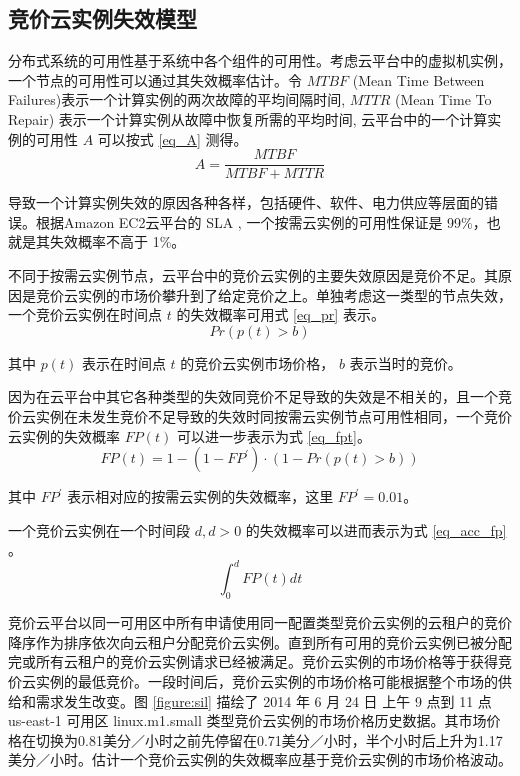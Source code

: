 \subsection{竞价云实例失效模型}
\label{jupiter-sifm}
分布式系统的可用性基于系统中各个组件的可用性。考虑云平台中的虚拟机实例，一个节点的可用性可以通过其失效概率估计。令 $MTBF$ (Mean Time Between Failures)表示一个计算实例的两次故障的平均间隔时间, $MTTR$ (Mean Time To Repair) 表示一个计算实例从故障中恢复所需的平均时间, 云平台中的一个计算实例的可用性 $A$ 可以按式 \eqref{eq_A} 测得。
\begin{equation}\label{eq_A}
A = \frac{MTBF}{MTBF+MTTR}
\end{equation}

导致一个计算实例失效的原因各种各样，包括硬件、软件、电力供应等层面的错误。根据Amazon EC2云平台的 SLA \cite{AWS_SLA:2014}, 一个按需云实例的可用性保证是 99\%，也就是其失效概率不高于 1\%。

不同于按需云实例节点，云平台中的竞价云实例的主要失效原因是竞价不足。其原因是竞价云实例的市场价攀升到了给定竞价之上。单独考虑这一类型的节点失效，一个竞价云实例在时间点 $t$ 的失效概率可用式 \eqref{eq_pr} 表示。
\begin{equation}\label{eq_pr}
Pr(p(t)>b)
\end{equation}

其中 $p(t)$ 表示在时间点 $t$ 的竞价云实例市场价格， $b$ 表示当时的竞价。


因为在云平台中其它各种类型的失效同竞价不足导致的失效是不相关的，且一个竞价云实例在未发生竞价不足导致的失效时同按需云实例节点可用性相同，一个竞价云实例的失效概率 $FP(t)$ 可以进一步表示为式 \eqref{eq_fpt}。
\begin{equation}\label{eq_fpt}
FP(t) = 1 - (1 - FP^{\prime}) \cdot (1 - Pr(p(t)>b))
\end{equation}

其中 $FP^{\prime}$ 表示相对应的按需云实例的失效概率，这里 $FP^{\prime} = 0.01$。

一个竞价云实例在一个时间段 $d, d>0$ 的失效概率可以进而表示为式 \eqref{eq_acc_fp} 。
\begin{equation}\label{eq_acc_fp}
\int_0^d FP(t)dt
\end{equation}

竞价云平台以同一可用区中所有申请使用同一配置类型竞价云实例的云租户的竞价降序作为排序依次向云租户分配竞价云实例。直到所有可用的竞价云实例已被分配完或所有云租户的竞价云实例请求已经被满足。竞价云实例的市场价格等于获得竞价云实例的最低竞价。一段时间后，竞价云实例的市场价格可能根据整个市场的供给和需求发生改变。图 \ref{figure:sil} 描绘了 2014 年 6 月 24 日 上午 9 点到 11 点 us-east-1 可用区 linux.m1.small 类型竞价云实例的市场价格历史数据。其市场价格在切换为0.81美分／小时之前先停留在0.71美分／小时，半个小时后上升为1.17美分／小时。估计一个竞价云实例的失效概率应基于竞价云实例的市场价格波动。

